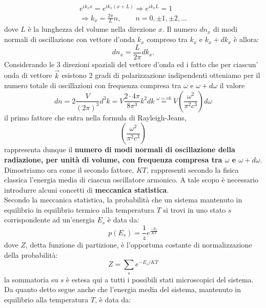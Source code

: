 \begin{eqnarray}
e^{ik_x x}= e^{ik_x (x+L)} \Rightarrow e^{ik_x L}=1  \nonumber\\ \Rightarrow k_x=\frac{2\pi}{L}n, \qquad n= 0, \pm 1, \pm 2,...
\end{eqnarray}
dove $L$ è la lunghezza del volume nella direzione $x$. Il numero $dn_x$ di modi normali di oscillazione con vettore d'onda $k_x$ compreso tra $k_x$ e $k_x+dk_x$ è allora:
\begin{equation}
dn_x =\frac{L}{2\pi}dk_x.
\end{equation}
Considerando le 3 direzioni spaziali del vettore d'onda ed i fatto che per ciascun' onda di vettore $\vec{k}$ esistono 2 gradi di polarizzazione indipendenti otteniamo per il numero totale di oscillazioni con frequenza compresa tra $\omega$ e $\omega + d\omega$ il valore
\begin{equation}
dn =2\frac{V}{(2\pi)^3}d^3k= V \frac{2\cdot 4\pi}{8\pi ^3} k^2 dk \overset{\omega =ck}{=} V \left( \frac{\omega ^2}{\pi ^2 c^3}\right) d\omega
\end{equation}
il primo fattore che entra nella formula di Rayleigh-Jeans,
\begin{equation}
\left( \frac{\omega ^2}{\pi ^2 c^3} \right)
\label{eq:cap1_1}
\end{equation}
rappresenta dunque il \textbf{numero di modi normali di oscillazione della radiazione, per unità di volume, con frequenza compresa tra $\omega$ e $\omega + d\omega$}.\\
Dimostriamo ora come il secondo fattore, $KT$, rappresenti secondo la fisica classica l'energia media di ciascun oscillatore armonico. A tale scopo è necessario introdurre alcuni concetti di \textbf{meccanica statistica}.\\
Secondo la meccanica statistica, la probabilità che un sistema mantenuto in equilibrio in equilibrio termico alla temperatura $T$ si trovi in uno stato $s$ corrispondente ad un'energia $E_s$ è data da:
\begin{equation}
p(E_s) =\frac{1}{z}e^{\frac{-E_s}{KT}}
\end{equation}
dove $Z$, detta funzione di partizione, è l'opportuna costante di normalizzazione della probabilità:
\begin{equation}
Z= \sum _s e^{-E_s / KT}
\end{equation} 
la sommatoria su $s$ è estesa qui a tutti i possibili stati microscopici del sistema.
Da quanto detto segue anche che l'energia media del sistema, mantenuto in equilibrio alla temperatura $T$, è data da:
